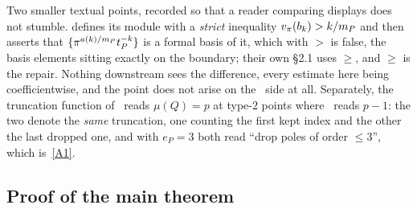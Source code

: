 Two smaller textual points, recorded so that a reader comparing displays
does not stumble. \cite[Definition 6.3]{kramermillerupton2021newton} defines
its module with a \emph{strict} inequality $v_{\pi}(b_k) > k/m_P$ and then
asserts that $\{\pi^{a(k)/m_P}t_P^{-k}\}$ is a formal basis of it, which
with $>$ is false, the basis elements sitting exactly on the boundary; their
own \S2.1 uses $\ge$, and $\ge$ is the repair. Nothing downstream sees the
difference, every estimate here being coefficientwise, and the point does
not arise on the~\cite{kramermiller2020abelian} side at all. Separately, the
truncation function of~\cite[eq.\ (33)]{kramermiller2020abelian} reads
$\mu(Q) = p$ at type-$2$ points where~\cite[eq.\
(11)]{kramermillerupton2021newton} reads $p-1$: the two denote the
\emph{same} truncation, one counting the first kept index and the other the
last dropped one, and with $e_P = 3$ both read ``drop poles of order $\le
3$'', which is~\ref{A1}.

\subsection{Proof of the main theorem}
\label{sec:proof-main}


